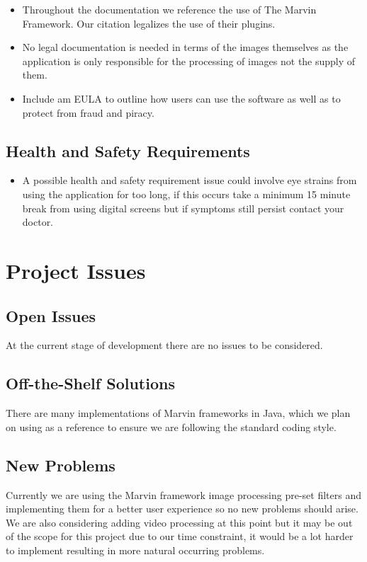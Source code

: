 \documentclass[12pt, titlepage]{article}
\begin{document}
\begin{itemize}
\item Throughout the documentation we reference the use of The Marvin Framework. Our citation legalizes the use of their plugins.
\item No legal documentation is needed in terms of the images themselves as the application is only responsible for the processing of images not the supply of them.
\item Include am EULA to outline how users can use the software as well as to protect from fraud and piracy.
\end{itemize}

\subsection{Health and Safety Requirements}
\begin{itemize}
	\item A possible health and safety requirement issue could involve eye strains from using the application for too long, if this occurs take a minimum 15 minute break from using digital screens but if symptoms still persist contact your doctor.
\end{itemize}


\newpage

\section{Project Issues}

\subsection{Open Issues}
At the current stage of development there are no issues to be considered.

\subsection{Off-the-Shelf Solutions}

There are many implementations of Marvin frameworks in Java, which we plan on using as a reference to ensure we are following the standard coding style.

\subsection{New Problems}

Currently we are using the Marvin framework image processing pre-set filters and implementing them for a better user experience so no new problems should arise. We are also considering adding video processing at this point but it may be out of the scope for this project due to our time constraint, it would be a lot harder to implement resulting in more natural occurring problems.
\end{document}
